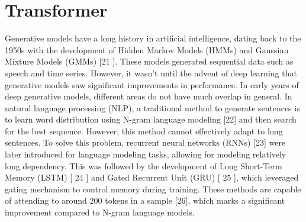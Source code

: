 \documentclass[conference]{IEEEtran}
\begin{document}
\section{Transformer}
\par Generative models have a long history in artificial intelligence, dating back to the 1950s with the
development of Hidden Markov Models (HMMs)\cite{b7} and Gaussian Mixture Models (GMMs) [21 ].
These models generated sequential data such as speech and time series. However, it wasn’t until
the advent of deep learning that generative models saw significant improvements in performance.
In early years of deep generative models, different areas do not have much overlap in general.
In natural language processing (NLP), a traditional method to generate sentences is to learn
word distribution using N-gram language modeling [22] and then search for the best sequence.
However, this method cannot effectively adapt to long sentences. To solve this problem, recurrent
neural networks (RNNs) [23] were later introduced for language modeling tasks, allowing for
modeling relatively long dependency. This was followed by the development of Long Short-Term
Memory (LSTM) [ 24 ] and Gated Recurrent Unit (GRU) [ 25 ], which leveraged gating mechanism to
control memory during training. These methods are capable of attending to around 200 tokens in a
sample [26], which marks a significant improvement compared to N-gram language models.
\end{document}
